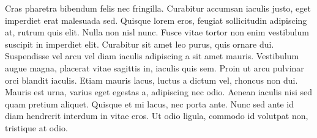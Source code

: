 Cras pharetra bibendum felis nec fringilla. Curabitur accumsan iaculis justo, eget imperdiet erat malesuada sed. Quisque lorem eros, feugiat sollicitudin adipiscing at, rutrum quis elit. Nulla non nisl nunc. Fusce vitae tortor non enim vestibulum suscipit in imperdiet elit. Curabitur sit amet leo purus, quis ornare dui. Suspendisse vel arcu vel diam iaculis adipiscing a sit amet mauris. Vestibulum augue magna, placerat vitae sagittis in, iaculis quis sem. Proin ut arcu pulvinar orci blandit iaculis. Etiam mauris lacus, luctus a dictum vel, rhoncus non dui. Mauris est urna, varius eget egestas a, adipiscing nec odio. Aenean iaculis nisi sed quam pretium aliquet. Quisque et mi lacus, nec porta ante. Nunc sed ante id diam hendrerit interdum in vitae eros. Ut odio ligula, commodo id volutpat non, tristique at odio.

